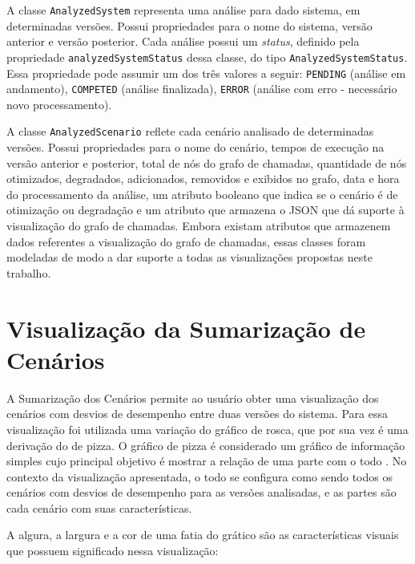 A classe \texttt{AnalyzedSystem} representa uma análise para dado sistema, em determinadas versões. Possui propriedades para o nome do sistema, versão anterior e versão posterior. Cada análise possui um \textit{status}, definido pela propriedade \texttt{analyzedSystemStatus} dessa classe, do tipo \texttt{AnalyzedSystemStatus}. Essa propriedade pode assumir um dos três valores a seguir: \texttt{PENDING} (análise em andamento), \texttt{COMPETED} (análise finalizada), \texttt{ERROR} (análise com erro - necessário novo processamento).

A classe \texttt{AnalyzedScenario} reflete cada cenário analisado de determinadas versões. Possui propriedades para o nome do cenário, tempos de execução na versão anterior e posterior, total de nós do grafo de chamadas, quantidade de nós otimizados, degradados, adicionados, removidos e exibidos no grafo, data e hora do processamento da análise, um atributo booleano que indica se o cenário é de otimização ou degradação e um atributo que armazena o JSON que dá suporte à visualização do grafo de chamadas. Embora existam atributos que armazenem dados referentes a visualização do grafo de chamadas, essas classes foram modeladas de modo a dar suporte a todas as visualizações propostas neste trabalho.

\section{Visualização da Sumarização de Cenários} \label{subsec:visualizacao1}

A Sumarização dos Cenários permite ao usuário obter uma visualização dos cenários com desvios de desempenho entre duas versões do sistema. Para essa visualização foi utilizada uma variação do gráfico de rosca, que por sua vez é uma derivação do de pizza. O gráfico de pizza é considerado um gráfico de informação simples cujo principal objetivo é mostrar a relação de uma parte com o todo \cite{Spence2005}. No contexto da visualização apresentada, o todo se configura como sendo todos os cenários com desvios de desempenho para as versões analisadas, e as partes são cada cenário com suas características.

A algura, a largura e a cor de uma fatia do grático são as características visuais que possuem significado nessa visualização:

